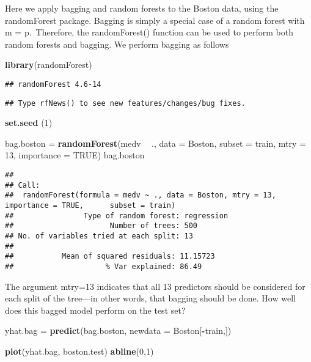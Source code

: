 \documentclass[]{article}
\newenvironment{Shaded}{\begin{snugshade}}{\end{snugshade}}
\newcommand{\KeywordTok}[1]{\textcolor[rgb]{0.13,0.29,0.53}{\textbf{#1}}}
\newcommand{\DataTypeTok}[1]{\textcolor[rgb]{0.13,0.29,0.53}{#1}}
\newcommand{\DecValTok}[1]{\textcolor[rgb]{0.00,0.00,0.81}{#1}}
\newcommand{\StringTok}[1]{\textcolor[rgb]{0.31,0.60,0.02}{#1}}
\newcommand{\OtherTok}[1]{\textcolor[rgb]{0.56,0.35,0.01}{#1}}
\newcommand{\OperatorTok}[1]{\textcolor[rgb]{0.81,0.36,0.00}{\textbf{#1}}}
\newcommand{\NormalTok}[1]{#1}
\begin{document}
Here we apply bagging and random forests to the Boston data, using the
randomForest package. Bagging is simply a special case of a random
forest with m = p.~Therefore, the randomForest() function can be used to
perform both random forests and bagging. We perform bagging as follows

\begin{Shaded}
\begin{Highlighting}[]
\KeywordTok{library}\NormalTok{(randomForest)}
\end{Highlighting}
\end{Shaded}

\begin{verbatim}
## randomForest 4.6-14
\end{verbatim}

\begin{verbatim}
## Type rfNews() to see new features/changes/bug fixes.
\end{verbatim}

\begin{Shaded}
\begin{Highlighting}[]
\KeywordTok{set.seed}\NormalTok{ (}\DecValTok{1}\NormalTok{)}

\NormalTok{bag.boston =}\StringTok{ }\KeywordTok{randomForest}\NormalTok{(medv }\OperatorTok{~}\StringTok{ }\NormalTok{., }\DataTypeTok{data =}\NormalTok{ Boston, }\DataTypeTok{subset =}\NormalTok{ train,}
                          \DataTypeTok{mtry =} \DecValTok{13}\NormalTok{,}
                          \DataTypeTok{importance =} \OtherTok{TRUE}\NormalTok{)}
\NormalTok{bag.boston}
\end{Highlighting}
\end{Shaded}

\begin{verbatim}
## 
## Call:
##  randomForest(formula = medv ~ ., data = Boston, mtry = 13, importance = TRUE,      subset = train) 
##                Type of random forest: regression
##                      Number of trees: 500
## No. of variables tried at each split: 13
## 
##           Mean of squared residuals: 11.15723
##                     % Var explained: 86.49
\end{verbatim}

The argument mtry=13 indicates that all 13 predictors should be
considered for each split of the tree---in other words, that bagging
should be done. How well does this bagged model perform on the test set?

\begin{Shaded}
\begin{Highlighting}[]
\NormalTok{yhat.bag =}\StringTok{ }\KeywordTok{predict}\NormalTok{(bag.boston, }\DataTypeTok{newdata =}\NormalTok{ Boston[}\OperatorTok{-}\NormalTok{train,])}

\KeywordTok{plot}\NormalTok{(yhat.bag, boston.test)}
\KeywordTok{abline}\NormalTok{(}\DecValTok{0}\NormalTok{,}\DecValTok{1}\NormalTok{)}
\end{Highlighting}
\end{Shaded}
\end{document}
